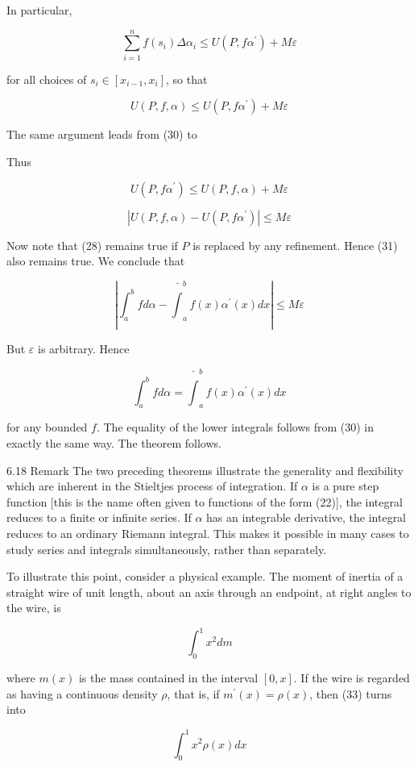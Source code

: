 \documentclass[10pt]{article}
\begin{document}
In particular,

$$
\sum_{i=1}^{n} f\left(s_{i}\right) \Delta \alpha_{i} \leq U\left(P, f \alpha^{\prime}\right)+M \varepsilon
$$

for all choices of $s_{i} \in\left[x_{i-1}, x_{i}\right]$, so that

$$
U(P, f, \alpha) \leq U\left(P, f \alpha^{\prime}\right)+M \varepsilon
$$

The same argument leads from (30) to

Thus

$$
U\left(P, f \alpha^{\prime}\right) \leq U(P, f, \alpha)+M \varepsilon
$$

$$
\left|U(P, f, \alpha)-U\left(P, f \alpha^{\prime}\right)\right| \leq M \varepsilon
$$

Now note that (28) remains true if $P$ is replaced by any refinement. Hence (31) also remains true. We conclude that

$$
\left|\int_{a}^{b} f d \alpha-\bar{\int}_{a}^{b} f(x) \alpha^{\prime}(x) d x\right| \leq M \varepsilon
$$

But $\varepsilon$ is arbitrary. Hence

$$
\int_{a}^{b} f d \alpha=\bar{\int}_{a}^{b} f(x) \alpha^{\prime}(x) d x
$$

for any bounded $f$. The equality of the lower integrals follows from (30) in exactly the same way. The theorem follows.

6.18 Remark The two preceding theorems illustrate the generality and flexibility which are inherent in the Stieltjes process of integration. If $\alpha$ is a pure step function [this is the name often given to functions of the form (22)], the integral reduces to a finite or infinite series. If $\alpha$ has an integrable derivative, the integral reduces to an ordinary Riemann integral. This makes it possible in many cases to study series and integrals simultaneously, rather than separately.

To illustrate this point, consider a physical example. The moment of inertia of a straight wire of unit length, about an axis through an endpoint, at right angles to the wire, is

$$
\int_{0}^{1} x^{2} d m
$$

where $m(x)$ is the mass contained in the interval $[0, x]$. If the wire is regarded as having a continuous density $\rho$, that is, if $m^{\prime}(x)=\rho(x)$, then (33) turns into

$$
\int_{0}^{1} x^{2} \rho(x) d x
$$
\end{document}
